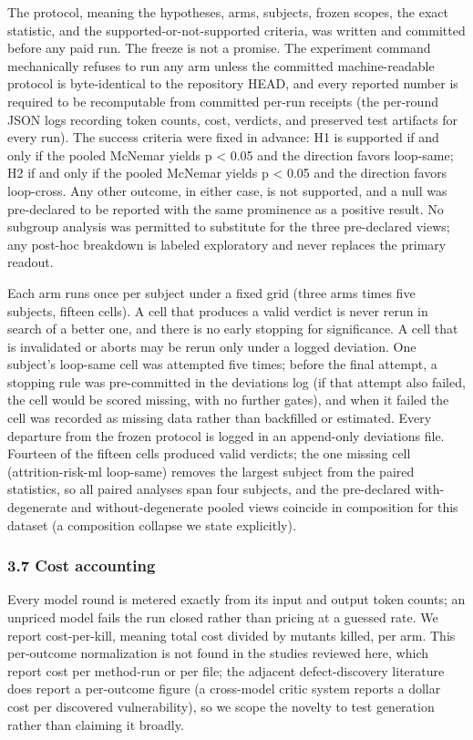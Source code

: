 \documentclass[
  11pt,
]{article}
\begin{document}
The protocol, meaning the hypotheses, arms, subjects, frozen scopes, the
exact statistic, and the supported-or-not-supported criteria, was
written and committed before any paid run. The freeze is not a promise.
The experiment command mechanically refuses to run any arm unless the
committed machine-readable protocol is byte-identical to the repository
HEAD, and every reported number is required to be recomputable from
committed per-run receipts (the per-round JSON logs recording token
counts, cost, verdicts, and preserved test artifacts for every run). The
success criteria were fixed in advance: H1 is supported if and only if
the pooled McNemar yields p \textless{} 0.05 and the direction favors
loop-same; H2 if and only if the pooled McNemar yields p \textless{}
0.05 and the direction favors loop-cross. Any other outcome, in either
case, is not supported, and a null was pre-declared to be reported with
the same prominence as a positive result. No subgroup analysis was
permitted to substitute for the three pre-declared views; any post-hoc
breakdown is labeled exploratory and never replaces the primary readout.

Each arm runs once per subject under a fixed grid (three arms times five
subjects, fifteen cells). A cell that produces a valid verdict is never
rerun in search of a better one, and there is no early stopping for
significance. A cell that is invalidated or aborts may be rerun only
under a logged deviation. One subject's loop-same cell was attempted
five times; before the final attempt, a stopping rule was pre-committed
in the deviations log (if that attempt also failed, the cell would be
scored missing, with no further gates), and when it failed the cell was
recorded as missing data rather than backfilled or estimated. Every
departure from the frozen protocol is logged in an append-only
deviations file. Fourteen of the fifteen cells produced valid verdicts;
the one missing cell (attrition-risk-ml loop-same) removes the largest
subject from the paired statistics, so all paired analyses span four
subjects, and the pre-declared with-degenerate and without-degenerate
pooled views coincide in composition for this dataset (a composition
collapse we state explicitly).

\subsubsection{3.7 Cost accounting}\label{cost-accounting}

Every model round is metered exactly from its input and output token
counts; an unpriced model fails the run closed rather than pricing at a
guessed rate. We report cost-per-kill, meaning total cost divided by
mutants killed, per arm. This per-outcome normalization is not found in
the studies reviewed here, which report cost per method-run or per file;
the adjacent defect-discovery literature does report a per-outcome
figure (a cross-model critic system reports a dollar cost per discovered
vulnerability), so we scope the novelty to test generation rather than
claiming it broadly.
\end{document}

